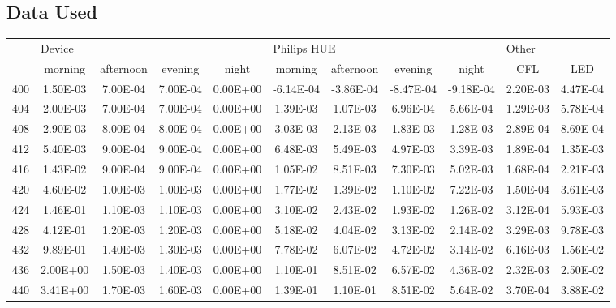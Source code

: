 \onecolumn
\begin{landscape}\small
\section{Data Used}

\begin{longtable}{c||c|c|c|c|c|c|c|c|c|c}
    \centering
    \multirow{2}{*}{Wavelength} & \multicolumn{4}{l}{Device} & \multicolumn{4}{l}{Philips HUE} & \multicolumn{2}{l}{Other} \\ \cline{2-11}
        	& morning & afternoon & evening & night & morning & afternoon & evening & night & CFL & LED \\ \hline\hline
        400 & 1.50E-03 & 7.00E-04 & 7.00E-04 & 0.00E+00 & -6.14E-04 & -3.86E-04 & -8.47E-04 & -9.18E-04 & 2.20E-03 & 4.47E-04 \\ \hline 
        404 & 2.00E-03 & 7.00E-04 & 7.00E-04 & 0.00E+00 & 1.39E-03 & 1.07E-03 & 6.96E-04 & 5.66E-04 & 1.29E-03 & 5.78E-04 \\ \hline
        408 & 2.90E-03 & 8.00E-04 & 8.00E-04 & 0.00E+00 & 3.03E-03 & 2.13E-03 & 1.83E-03 & 1.28E-03 & 2.89E-04 & 8.69E-04 \\ \hline
        412 & 5.40E-03 & 9.00E-04 & 9.00E-04 & 0.00E+00 & 6.48E-03 & 5.49E-03 & 4.97E-03 & 3.39E-03 & 1.89E-04 & 1.35E-03 \\ \hline
        416 & 1.43E-02 & 9.00E-04 & 9.00E-04 & 0.00E+00 & 1.05E-02 & 8.51E-03 & 7.30E-03 & 5.02E-03 & 1.68E-04 & 2.21E-03 \\ \hline
        420 & 4.60E-02 & 1.00E-03 & 1.00E-03 & 0.00E+00 & 1.77E-02 & 1.39E-02 & 1.10E-02 & 7.22E-03 & 1.50E-04 & 3.61E-03 \\ \hline
        424 & 1.46E-01 & 1.10E-03 & 1.10E-03 & 0.00E+00 & 3.10E-02 & 2.43E-02 & 1.93E-02 & 1.26E-02 & 3.12E-04 & 5.93E-03 \\ \hline
        428 & 4.12E-01 & 1.20E-03 & 1.20E-03 & 0.00E+00 & 5.18E-02 & 4.04E-02 & 3.13E-02 & 2.14E-02 & 3.29E-03 & 9.78E-03 \\ \hline
        432 & 9.89E-01 & 1.40E-03 & 1.30E-03 & 0.00E+00 & 7.78E-02 & 6.07E-02 & 4.72E-02 & 3.14E-02 & 6.16E-03 & 1.56E-02 \\ \hline
        436 & 2.00E+00 & 1.50E-03 & 1.40E-03 & 0.00E+00 & 1.10E-01 & 8.51E-02 & 6.57E-02 & 4.36E-02 & 2.32E-03 & 2.50E-02 \\ \hline
        440 & 3.41E+00 & 1.70E-03 & 1.60E-03 & 0.00E+00 & 1.39E-01 & 1.10E-01 & 8.51E-02 & 5.64E-02 & 3.70E-04 & 3.88E-02 \\ \hline

\end{longtable}
\end{landscape}
